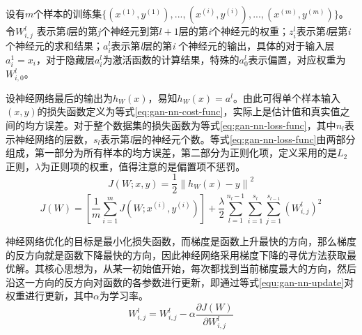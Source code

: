 设有$m$个样本的训练集$\{(x^{(1)}, y^{(1)}), ..., (x^{(i)}, y^{(i)}), ..., (x^{(m)}, y^{(m)})\}$。令$W_{i,j}^{l}$ 表示第\emph{l}层的第\emph{j}个神经元到第$l+1$层的第\emph{i}个神经元的权重；$z_{i}^{l}$表示第\emph{l}层第\emph{i}个神经元的求和结果；$a_{i}^{l}$表示第\emph{l}层的第\emph{i} 个神经元的输出，具体的对于输入层$a_{i}^{1} = x_{i}$，对于隐藏层$a_{i}^{l}$为激活函数的计算结果，特殊的$a_{0}^{l}$表示偏置，对应权重为$W_{i,0}^{l}$。

设神经网络最后的输出为$h_{W}(x)$，易知$ h_{W}(x) = a^{l}$。由此可得单个样本输入$(x,y)$的损失函数定义为等式\ref{eq:gan-nn-cost-func}，实际上是估计值和真实值之间的均方误差。对于整个数据集的损失函数为等式\ref{eq:gan-nn-loss-func}，其中$n_{l}$表示神经网络的层数，$s_{l}$表示第\emph{l}层的神经元个数。等式\ref{eq:gan-nn-loss-func}由两部分组成，第一部分为所有样本的均方误差，第二部分为正则化项，定义采用的是$L_{2}$正则，$\lambda$为正则项的权重，值得注意的是偏置项不惩罚。
\begin{equation}
\label{eq:gan-nn-cost-func}
J(W;x,y) = \frac{1}{2}\left \| h_{W}(x) - y \right \|^{2}
\end{equation}
\begin{equation}
\label{eq:gan-nn-loss-func}
J(W) = [\frac{1}{m}\sum_{i=1}^{m}J(W;x^{(i)}, y^{(i)})] + \frac{\lambda}{2}\sum_{l=1}^{n_{l}-1}\sum_{i=1}^{s_{l}}\sum_{j=1}^{s_{l-1}}(W_{i,j}^{l})^{2}
\end{equation}

神经网络优化的目标是最小化损失函数，而梯度是函数上升最快的方向，那么梯度的反方向就是函数下降最快的方向，因此神经网络采用梯度下降的寻优方法获取最优解。其核心思想为，从某一初始值开始，每次都找到当前梯度最大的方向，然后沿这一方向的反方向对函数的各参数进行更新，即通过等式\ref{equ:gan-nn-update}对权重进行更新，其中$\alpha$为学习率。
\begin{equation}
\label{equ:gan-nn-update}
W_{i,j}^{l} = W_{i,j}^{l} - \alpha \frac{\partial J(W)}{\partial W_{i,j}^{l}} 
\end{equation}

